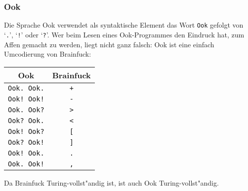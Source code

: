 \subsubsection{Ook}
Die Sprache Ook verwendet als syntaktische Element das Wort {\tt Ook} gefolgt
von `{\tt .}', `{\tt !}' oder `{\tt ?}'. Wer beim Lesen eines Ook-Programmes
den Eindruck hat, zum Affen gemacht zu werden, liegt nicht ganz falsch:
Ook ist eine einfach Umcodierung von Brainfuck:
\begin{center}
\begin{tabular}{|c|c|}
\hline
Ook&Brainfuck\\
\hline
{\tt Ook. Ook.}&{\tt +}\\
{\tt Ook! Ook!}&{\tt -}\\
{\tt Ook. Ook?}&{\tt >}\\
{\tt Ook? Ook.}&{\tt <}\\
{\tt Ook! Ook?}&{\tt [}\\
{\tt Ook? Ook!}&{\tt ]}\\
{\tt Ook! Ook.}&{\tt .}\\
{\tt Ook. Ook!}&{\tt ,}\\
\hline
\end{tabular}
\end{center}
Da Brainfuck Turing-vollst"andig ist, ist auch Ook Turing-vollst"andig.
